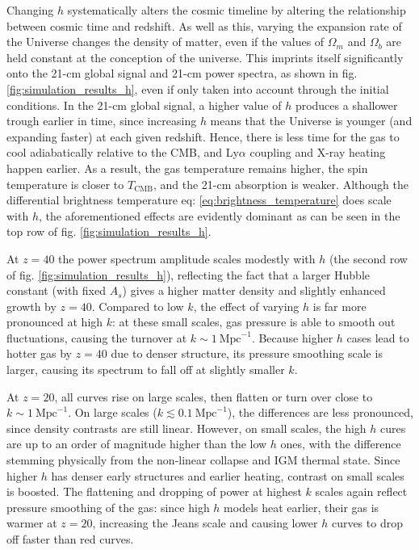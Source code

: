 \documentclass[floats,floatfix,showpacs,amssymb,prd,superscriptaddress,nofootinbib]{revtex4-2} %
\begin{document}
Changing $h$ systematically alters the cosmic timeline by altering the relationship between cosmic time and redshift. As well as this, varying the expansion rate of the Universe changes the density of matter, even if the values of $\Omega_m$ and $\Omega_b$ are held constant at the conception of the universe. This imprints itself significantly onto the 21-cm global signal and 21-cm power spectra, as shown in fig. \ref{fig:simulation_results_h}, even if only taken into account through the initial conditions. In the 21-cm global signal, a higher value of $h$ produces a shallower trough earlier in time, since increasing $h$ means that the Universe is younger (and expanding faster) at each given redshift. Hence, there is less time for the gas to cool adiabatically relative to the CMB, and Ly$\alpha$ coupling and X-ray heating happen earlier. As a result, the gas temperature remains higher, the spin temperature is closer to $T_{\text{CMB}}$, and the 21-cm absorption is weaker. Although the differential brightness temperature eq: \ref{eq:brightness_temperature} does scale with $h$, the aforementioned effects are evidently dominant as can be seen in the top row of fig. \ref{fig:simulation_results_h}. 

At $z = 40$ the power spectrum amplitude scales modestly with $h$ (the second row of fig. \ref{fig:simulation_results_h}), reflecting the fact that a larger Hubble constant (with fixed $A_s$) gives a higher matter density and slightly enhanced growth by $z = 40$. Compared to low $k$, the effect of varying $h$ is far more pronounced at high $k$: at these small scales, gas pressure is able to smooth out fluctuations, causing the turnover at $k \sim 1 ~\text{Mpc}^{-1}$. Because higher $h$ cases lead to hotter gas by $z = 40$ due to denser structure, its pressure smoothing scale is larger, causing its spectrum to fall off at slightly smaller $k$. 

At $z = 20$, all curves rise on large scales, then flatten or turn over close to $k \sim 1 ~\text{Mpc}^{-1}$. On large scales ($k \lesssim 0.1 ~\text{Mpc}^{-1}$), the differences are less pronounced, since density contrasts are still linear. However, on small scales, the high $h$ cures are up to an order of magnitude higher than the low $h$ ones, with the difference stemming physically from the non-linear collapse and IGM thermal state. Since higher $h$ has denser early structures and earlier heating, contrast on small scales is boosted. The flattening and dropping of power at highest $k$ scales again reflect pressure smoothing of the gas: since high $h$ models heat earlier, their gas is warmer at $z = 20$, increasing the Jeans scale and causing lower $h$ curves to drop off faster than red curves.
\end{document}
